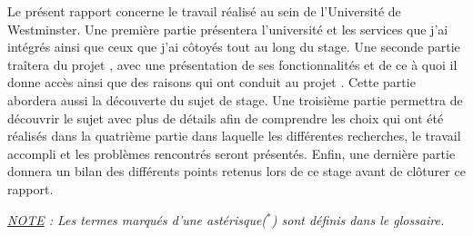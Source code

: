 Le pr\'esent rapport concerne le travail r\'ealis\'e au sein de l'Universit\'e de Westminster.
Une premi\`ere partie pr\'esentera l'universit\'e et les services que j'ai int\'egr\'es ainsi que ceux que j'ai c\^otoy\'es tout au long du stage.
Une seconde partie tra\^itera du projet \Yuukou{}, avec une pr\'esentation de ses fonctionnalit\'es et de ce \`a quoi il donne acc\`es  ainsi que des raisons qui ont conduit au projet \YuukouII.
Cette partie abordera aussi la d\'ecouverte du sujet de stage.
Une troisi\`eme partie permettra de d\'ecouvrir le sujet avec plus de d\'etails afin de comprendre les choix qui ont \'et\'e r\'ealis\'es dans la quatri\`eme partie dans laquelle les diff\'erentes recherches, le travail accompli et les probl\`emes rencontr\'es seront pr\'esent\'es.
Enfin, une derni\`ere partie donnera un bilan des diff\'erents points retenus lors de ce stage avant de cl\^oturer ce rapport.

\vspace{1.5cm}

\begin{center}
\textit{\underline{NOTE} : Les termes marqu\'es d'une ast\'erisque($^*$) sont d\'efinis dans le glossaire.}

\end{center}

\clearpage
